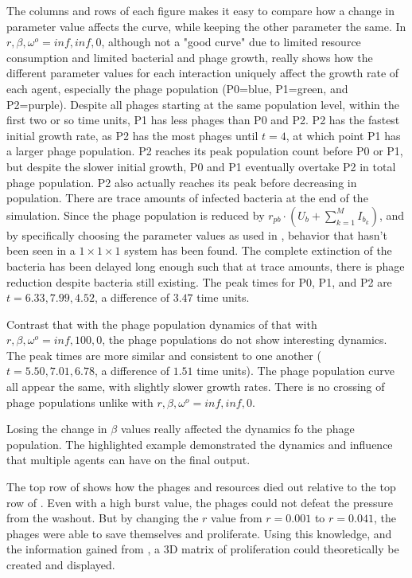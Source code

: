 The columns and rows of each figure makes it easy to compare how a change in parameter value affects the curve, while keeping the other parameter the same. 
In $r, \beta, \omega^o=inf, inf, 0$, although not a "good curve" due to limited resource consumption and limited bacterial and phage growth, really shows how the different parameter values for each interaction uniquely affect the growth rate of each agent, especially the phage population (P0=blue, P1=green, and P2=purple). 
Despite all phages starting at the same population level, within the first two or so time units, P1 has less phages than P0 and P2. 
P2 has the fastest initial growth rate, as P2 has the most phages until $t=4$, at which point P1 has a larger phage population. 
P2 reaches its peak population count before P0 or P1, but despite the slower initial growth, P0 and P1 eventually overtake P2 in total phage population. 
P2 also actually reaches its peak before decreasing in population. 
There are trace amounts of infected bacteria at the end of the simulation. 
Since the phage population is reduced by $r_{pb}\cdot(U_b + \sum_{k=1}^M I_{b_k})$, and by specifically choosing the parameter values as used in , behavior that hasn't been seen in a $1\times 1\times 1$ system has been found. 
The complete extinction of the bacteria has been delayed long enough such that at trace amounts, there is phage reduction despite bacteria still existing. 
The peak times for P0, P1, and P2 are $t=6.33, 7.99, 4.52$, a difference of $3.47$ time units. 

Contrast that with the phage population dynamics of that with $r, \beta, \omega^o = inf, 100, 0$, the phage populations do not show interesting dynamics. 
The peak times are more similar and consistent to one another ($t=5.50, 7.01, 6.78$, a difference of $1.51$ time units). 
The phage population curve all appear the same, with slightly slower growth rates. 
There is no crossing of phage populations unlike with $r, \beta, \omega^o=inf, inf, 0$. 

Losing the change in $\beta$ values really affected the dynamics fo the phage population. 
The highlighted example demonstrated the dynamics and influence that multiple agents can have on the final output. 

The top row of  shows how the phages and resources died out relative to the top row of . 
Even with a high burst value, the phages could not defeat the pressure from the washout. 
But by changing the $r$ value from $r=0.001$ to $r=0.041$, the phages were able to save themselves and proliferate. 
Using this knowledge, and the information gained from , a 3D matrix of proliferation could theoretically be created and displayed. 

